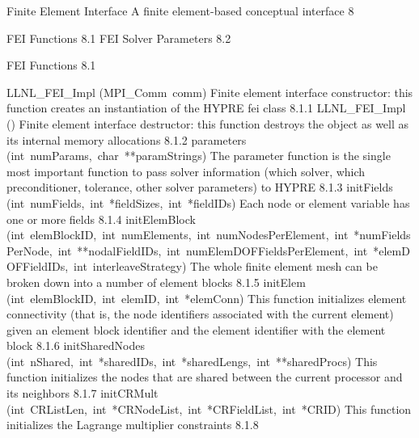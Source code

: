 \documentclass{article}
\begin{document}
\begin{cxxentry}
{}
        {Finite Element Interface}
        {}
        {A finite element-based conceptual interface}
        {8}
\begin{cxxnames}
\cxxitem{}
        {FEI Functions }
        {}
        {
}
        {8.1}
\cxxitem{}
        {FEI Solver Parameters}
        {}
        {
}
        {8.2}
\end{cxxnames}
\begin{cxxentry}
{}
        {FEI Functions }
        {}
        {
}
        {8.1}
\begin{cxxnames}
\cxxitem{}
        {LLNL\_FEI\_Impl}
        {(MPI\_Comm\ comm)}
        {
Finite element interface constructor: this function creates an
instantiation of the HYPRE fei class}
        {8.1.1}
\cxxitem{}
        {\cxxtilde LLNL\_FEI\_Impl}
        {()}
        {
Finite element interface destructor: this function destroys
the object as well as its internal memory allocations}
        {8.1.2}
        {parameters}
        {(int\ numParams,\ char\ **paramStrings)}
        {
The parameter function is the single most important function
to pass solver information (which solver, which preconditioner,
tolerance, other solver parameters) to HYPRE}
        {8.1.3}
        {initFields}
        {(int\ numFields,\ int\ *fieldSizes,\ int\ *fieldIDs)}
        {
Each node or element variable has one or more fields}
        {8.1.4}
        {initElemBlock}
        {(int\ elemBlockID,\ int\ numElements,\ int\ numNodesPerElement,\ int\ *numFieldsPerNode,\ int\ **nodalFieldIDs,\ int\ numElemDOFFieldsPerElement,\ int\ *elemDOFFieldIDs,\ int\ interleaveStrategy)}
        {
The whole finite element mesh can be broken down into a number of
element blocks}
        {8.1.5}
        {initElem}
        {(int\ elemBlockID,\ int\ elemID,\ int\ *elemConn)}
        {
This function initializes element connectivity (that is, the node
identifiers associated with the current element) given an element 
block identifier and the element identifier with the element block}
        {8.1.6}
        {initSharedNodes}
        {(int\ nShared,\ int\ *sharedIDs,\ int\ *sharedLengs,\ int\ **sharedProcs)}
        {
This function initializes the nodes that are shared between the
current processor and its neighbors}
        {8.1.7}
        {initCRMult}
        {(int\ CRListLen,\ int\ *CRNodeList,\ int\ *CRFieldList,\ int\ *CRID)}
        {
This function initializes the Lagrange multiplier constraints
}
        {8.1.8}

\end{cxxnames}
\end{cxxentry}
\end{cxxentry}
\end{document}
